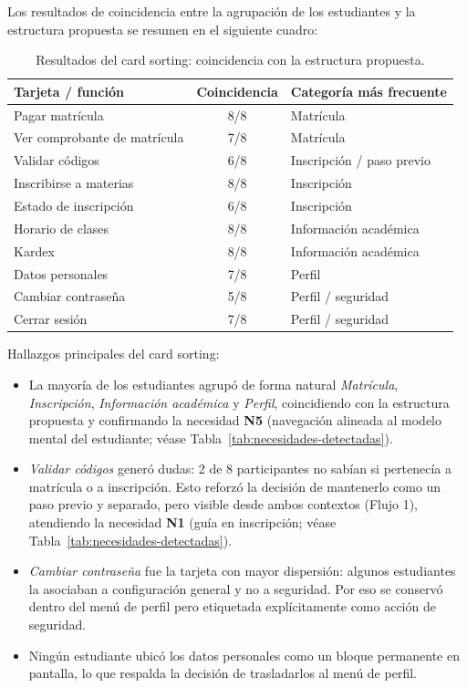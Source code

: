 \noindent Los resultados de coincidencia entre la agrupación de los estudiantes y la estructura propuesta se resumen en el siguiente cuadro:

\begin{table}[H]
\centering
\begin{tabular}{|p{5.5cm}|c|p{5.0cm}|}
\hline
\textbf{Tarjeta / funci\'on} & \textbf{Coincidencia} & \textbf{Categor\'ia m\'as frecuente} \\
\hline
Pagar matrícula & 8/8 & Matrícula \\
\hline
Ver comprobante de matrícula & 7/8 & Matrícula \\
\hline
Validar códigos & 6/8 & Inscripción / paso previo \\
\hline
Inscribirse a materias & 8/8 & Inscripción \\
\hline
Estado de inscripción & 6/8 & Inscripción \\
\hline
Horario de clases & 8/8 & Información académica \\
\hline
Kardex & 8/8 & Información académica \\
\hline
Datos personales & 7/8 & Perfil \\
\hline
Cambiar contraseña & 5/8 & Perfil / seguridad \\
\hline
Cerrar sesión & 7/8 & Perfil / seguridad \\
\hline
\end{tabular}
\caption{Resultados del card sorting: coincidencia con la estructura propuesta.}
\label{tab:card-sorting}
\end{table}

\noindent Hallazgos principales del card sorting:

\begin{itemize}
  \item La mayoría de los estudiantes agrupó de forma natural \textit{Matrícula}, \textit{Inscripción}, \textit{Información académica} y \textit{Perfil}, coincidiendo con la estructura propuesta y confirmando la necesidad \textbf{N5} (navegación alineada al modelo mental del estudiante; véase Tabla~\ref{tab:necesidades-detectadas}).
  \item \textit{Validar códigos} generó dudas: 2 de 8 participantes no sabían si pertenecía a matrícula o a inscripción. Esto reforzó la decisión de mantenerlo como un paso previo y separado, pero visible desde ambos contextos (Flujo 1), atendiendo la necesidad \textbf{N1} (guía en inscripción; véase Tabla~\ref{tab:necesidades-detectadas}).
  \item \textit{Cambiar contraseña} fue la tarjeta con mayor dispersión: algunos estudiantes la asociaban a configuración general y no a seguridad. Por eso se conservó dentro del menú de perfil pero etiquetada explícitamente como acción de seguridad.
  \item Ningún estudiante ubicó los datos personales como un bloque permanente en pantalla, lo que respalda la decisión de trasladarlos al menú de perfil.
\end{itemize}

